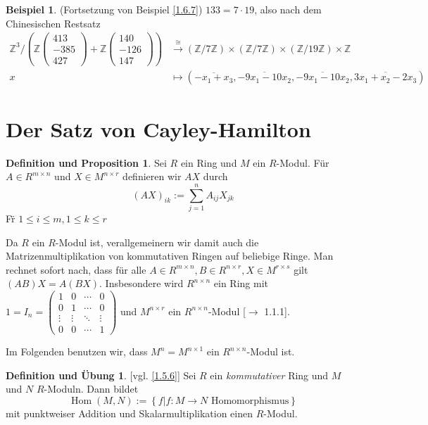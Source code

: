 \documentclass[
twoside=semi,
fontsize=12,
DIV=12, 
cleardoublepage=current,
leqno,
headings=optiontoheadandtoc, 
toc=idx
]{scrbook}
\newcommand{\Z}{\mathbb{Z}}
\newcommand{\brac}[1]{\left( #1 \right)}
\newcommand{\set}[1]{\left\{ #1 \right\}}
\DeclareMathOperator{\Hom}{Hom}
\theoremstyle{definition}
\newtheorem{beispiel}[definition]{Beispiel}
\newtheorem{def-prop}[definition]{Definition und Proposition}
\newtheorem{def-ueb}[definition]{Definition und \"Ubung}
\begin{document}
	\begin{beispiel}\label{1.6.12}
		(Fortsetzung von Beispiel \ref{1.6.7})\newline
		$133 = 7 \cdot 19$, also nach dem Chinesischen Restsatz
		\begin{align*}
			\Z^3/\brac{\Z\begin{pmatrix}413\\-385\\427\end{pmatrix} + \Z\begin{pmatrix}140\\-126\\147\end{pmatrix}} &\overset{\cong}{\rightarrow} (\Z/7\Z) \times (\Z/7\Z) \times (\Z/19\Z) \times \Z\\
				x &\mapsto (\overline{-x_1+x_3}, \overline{-9x_1-10x_2}, \overline{-9x_1-10x_2}, \overline{3x_1+x_2-2x_3})
		\end{align*}
	\end{beispiel}

	\newpage
	\section{Der Satz von Cayley-Hamilton}
	\begin{def-prop}\label{1.7.1}
		Sei $R$ ein Ring und $M$ ein $R$-Modul. F\"ur $A \in R^{m\times n}$ und $X\in M^{n\times r}$ definieren wir $AX$ durch
			\[(AX)_{ik} := \sum_{j=1}^n A_{ij}X_{jk}\]
		F\"r $1\leq i \leq m, 1 \leq k \leq r$
		
		Da $R$ ein $R$-Modul ist, verallgemeinern wir damit auch die Matrizenmultiplikation von kommutativen Ringen auf beliebige Ringe. Man rechnet sofort nach, dass f\"ur alle $A \in R^{m\times n}, B \in R^{n \times r}, X \in M^{r \times s}$ gilt $(AB)X = A(BX)$. Insbesondere wird $R^{n \times n}$ ein Ring mit $1 = I_n = \begin{pmatrix}
			1 & 0 & \cdots & 0\\
			0 & 1 & \cdots & 0\\
			\vdots & \vdots & \ddots & \vdots\\
			0 & 0 & \cdots & 1
		\end{pmatrix}$ und $M^{n \times r}$ ein $R^{n \times n}$-Modul [$\to$ 1.1.1].
	
		Im Folgenden benutzen wir, dass $M^n = M^{n\times 1}$ ein $R^{n\times n}$-Modul ist.
	\end{def-prop}
	
	\begin{def-ueb}\label{1.7.2}
		[vgl. \ref{1.5.6}]\newline
		Sei $R$ ein \emph{kommutativer} Ring und $M$ und $N$ $R$-Moduln. Dann bildet 
			\[\Hom(M,N) := \set{f|f:M \to N \textrm{ Homomorphismus}}\]
		mit punktweiser Addition und Skalarmultiplikation einen $R$-Modul.
	\end{def-ueb}
\end{document}
